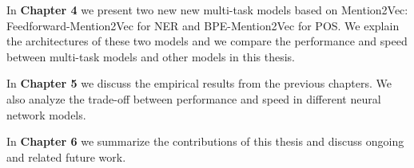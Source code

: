 In \textbf{Chapter 4} we present two new new multi-task models based on Mention2Vec: Feedforward-Mention2Vec for NER and BPE-Mention2Vec for POS. We explain the architectures of these two models and we compare the performance and speed between multi-task models and other models in this thesis.

In \textbf{Chapter 5} we discuss the empirical results from the previous chapters. We also analyze the trade-off between performance and speed in different neural network models.

In \textbf{Chapter 6} we summarize the contributions of this thesis and discuss ongoing and related future work.